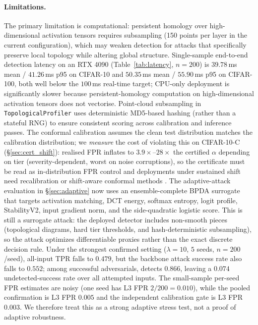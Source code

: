 \paragraph{Limitations.}
The primary limitation is computational: persistent homology over 
high-dimensional activation tensors requires subsampling 
(150 points per layer in the current configuration), which may weaken detection for attacks
that specifically preserve local topology while altering global structure.
Single-sample end-to-end detection latency on an RTX 4090
(Table~\ref{tab:latency}, $n=200$) is $39.78$\,ms mean / $41.26$\,ms
p95 on CIFAR-10 and $50.35$\,ms mean / $55.90$\,ms p95 on CIFAR-100,
both well below the $100$\,ms real-time target; CPU-only deployment is
significantly slower because persistent-homology computation on
high-dimensional activation tensors does not vectorise.
Point-cloud subsampling in \texttt{TopologicalProfiler} uses
deterministic MD5-based hashing (rather than a stateful RNG) to ensure
consistent scoring across calibration and inference passes.
The conformal calibration assumes the clean test distribution matches
the calibration distribution; we \emph{measure} the cost of violating
this on CIFAR-10-C (\S\ref{sec:cert_shift}): realised FPR inflates to
$3.9\times$--$28\times$ the certified $\alpha$ depending on tier
(severity-dependent, worst on noise corruptions), so the certificate
must be read as in-distribution FPR control and deployments under
sustained shift need recalibration or shift-aware conformal methods
\cite{tibshirani2019conformal}.
The adaptive-attack evaluation in \S\ref{sec:adaptive} now uses an
ensemble-complete BPDA surrogate that targets activation matching, DCT
energy, softmax entropy, logit profile, StabilityV2, input gradient norm,
and the side-quadratic logistic score. This is still a surrogate attack:
the deployed detector includes non-smooth pieces (topological diagrams,
hard tier thresholds, and hash-deterministic subsampling), so the attack
optimizes differentiable proxies rather than the exact discrete decision
rule. Under the strongest confirmed setting ($\lambda{=}10$, $5$ seeds,
$n{=}200$/seed), all-input TPR falls to $0.479$, but the backbone attack
success rate also falls to $0.552$; among successful adversarials,
\prism detects $0.866$, leaving a $0.074$ undetected-success rate over
all attempted inputs. The small-sample per-seed FPR estimates are noisy
(one seed has L3 FPR $2/200=0.010$), while the pooled confirmation is
L3 FPR $0.005$ and the independent calibration gate is L3 FPR $0.003$.
We therefore treat this as a strong adaptive stress test, not a proof of
adaptive robustness.

